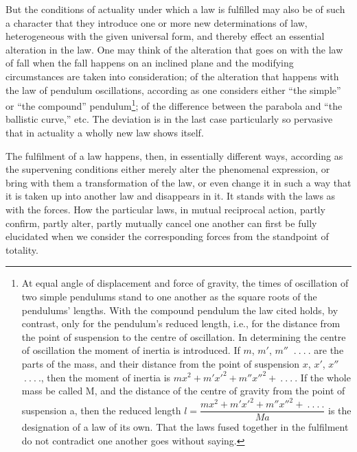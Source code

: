 \documentclass[12pt,a4paper]{book}
\begin{document}
But the conditions of actuality under which a law is fulfilled may also be of such a
character that they introduce one or more new determinations of law, heterogeneous with
the given universal form, and thereby effect an essential alteration in the law. One may
think of the alteration that goes on with the law of fall when the fall happens on an
inclined plane and the modifying circumstances are taken into consideration;
of the alteration that happens with the law of pendulum oscillations, according as one
considers either ``the simple'' or ``the compound'' pendulum\footnote{At equal angle of
displacement and force of gravity, the times of oscillation of two simple pendulums
stand to one another as the square roots of the pendulums' lengths. With the compound
pendulum the law cited holds, by contrast, only for the pendulum's reduced length, i.e.,
for the distance from the point of suspension to the centre of oscillation. In
determining the centre of oscillation the moment of inertia is introduced. If $m$, $m'$,
$m''$ $\ .\ .\ .\ .$ are the parts of the mass, and their distance from the point of
suspension $x$, $x'$, $x''$ $\ .\ .\ .\ .$, then the moment of inertia is
$mx^{2} + m'x'^{2} + m''x''^{2} + \ .\ .\ .\ .$ If the whole mass be called M, and the
distance of the centre of gravity from the point of suspension a, then the reduced
length
$l = \dfrac{mx^{2} + m'x'^{2} + m''x''^{2} + \ .\ .\ .\ .}{Ma}$
is the designation of a law of its own. That the laws fused together in the fulfilment
do not contradict one another goes without saying.}; of the difference between the
parabola and ``the ballistic curve,'' etc. The deviation is in the last case
particularly so pervasive that in actuality a wholly new law shows itself.

The fulfilment of a law happens, then, in essentially different ways, according as the
supervening conditions either merely alter the phenomenal expression, or bring with them
a transformation of the law, or even change it in such a way that it is taken up into
another law and disappears in it. It stands with the laws as with the forces. How the
particular laws, in mutual reciprocal action, partly confirm, partly alter, partly
mutually cancel one another can first be fully elucidated when we consider the
corresponding forces from the standpoint of totality.
\end{document}
